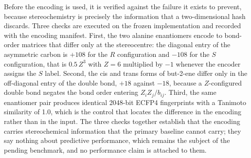 Before the encoding is used, it is verified against the failure it exists to prevent, because stereochemistry is precisely the information that a two-dimensional hash discards. Three checks are executed on the frozen implementation and recorded with the encoding manifest. First, the two alanine enantiomers encode to bond-order matrices that differ only at the stereocentre: the diagonal entry of the asymmetric carbon is $+\num{108}$ for the $R$ configuration and $\num{-108}$ for the $S$ configuration, that is $0.5\,Z^{3}$ with $Z = \num{6}$ multiplied by $\num{-1}$ whenever the encoder assigns the $S$ label. Second, the cis and trans forms of but-2-ene differ only in the off-diagonal entry of the double bond, $+\num{18}$ against $\num{-18}$, because a $Z$-configured double bond negates the bond order entering $Z_i Z_j / b_{ij}$. Third, the same enantiomer pair produces identical \num{2048}-bit ECFP4 fingerprints with a Tanimoto similarity of \num{1.0}, which is the control that locates the difference in the encoding rather than in the input. The three checks together establish that the encoding carries stereochemical information that the primary baseline cannot carry; they say nothing about predictive performance, which remains the subject of the pending benchmark, and no performance claim is attached to them.

